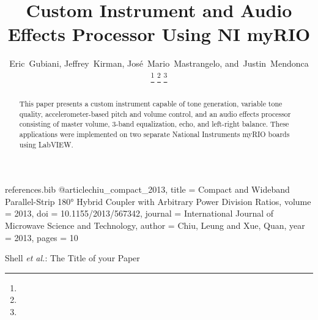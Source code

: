 \begin{filecontents*}{references.bib}
@article{chiu_compact_2013,
	title = {Compact and Wideband Parallel-Strip 180° Hybrid Coupler with Arbitrary Power Division Ratios},
	volume = {2013},
	doi = {10.1155/2013/567342},
	journal = {International Journal of Microwave Science and Technology},
	author = {Chiu, Leung and Xue, Quan},
	year = {2013},
	pages = {10}
}
\end{filecontents*}
%


%
\title{Custom Instrument and Audio Effects Processor Using NI myRIO}
%
%
%

\author{Eric~Gubiani, Jeffrey~Kirman, Jos\'{e}~Mario~Mastrangelo, and~Justin~Mendonca

\thanks{ 
 }
\thanks{}%
\thanks{}%
}


\markboth{}%
{Shell \MakeLowercase{\textit{et al.}}: The Title of your Paper}
%

\maketitle

\begin{abstract}
This paper presents a custom instrument capable of tone generation, variable tone quality, accelerometer-based pitch and volume control, and an audio effects processor consisting of master volume, 3-band equalization, echo, and left-right balance. 
These applications were implemented on two separate National Instruments myRIO boards using LabVIEW. 
\end{abstract}

